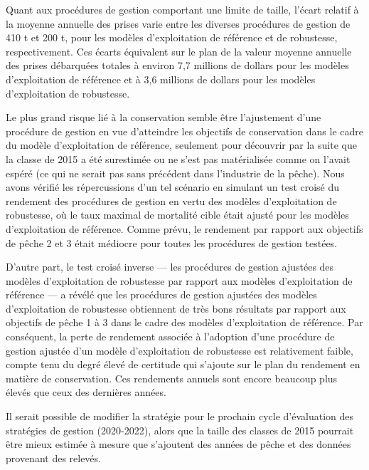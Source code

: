 \documentclass[11pt]{book}
\begin{document}
Quant aux procédures de gestion comportant une limite de taille, l'écart relatif à la moyenne annuelle des prises varie entre les diverses procédures de gestion de 410 t et 200 t, pour les modèles d'exploitation de référence et de robustesse, respectivement. Ces écarts équivalent sur le plan de la valeur moyenne annuelle des prises débarquées totales à environ 7,7 millions de dollars pour les modèles d'exploitation de référence et à 3,6 millions de dollars pour les modèles d'exploitation de robustesse.

Le plus grand risque lié à la conservation semble être l'ajustement d'une procédure de gestion en vue d'atteindre les objectifs de conservation dans le cadre du modèle d'exploitation de référence, seulement pour découvrir par la suite que la classe de 2015 a été surestimée ou ne s'est pas matérialisée comme on l'avait espéré (ce qui ne serait pas sans précédent dans l'industrie de la pêche). Nous avons vérifié les répercussions d'un tel scénario en simulant un test croisé du rendement des procédures de gestion en vertu des modèles d'exploitation de robustesse, où le taux maximal de mortalité cible était ajusté pour les modèles d'exploitation de référence. Comme prévu, le rendement par rapport aux objectifs de pêche 2 et 3 était médiocre pour toutes les procédures de gestion testées.

D'autre part, le test croisé inverse --- les procédures de gestion ajustées des modèles d'exploitation de robustesse par rapport aux modèles d'exploitation de référence --- a révélé que les procédures de gestion ajustées des modèles d'exploitation de robustesse obtiennent de très bons résultats par rapport aux objectifs de pêche 1 à 3 dans le cadre des modèles d'exploitation de référence. Par conséquent, la perte de rendement associée à l'adoption d'une procédure de gestion ajustée d'un modèle d'exploitation de robustesse est relativement faible, compte tenu du degré élevé de certitude qui s'ajoute sur le plan du rendement en matière de conservation. Ces rendements annuels sont encore beaucoup plus élevés que ceux des dernières années.

Il serait possible de modifier la stratégie pour le prochain cycle d'évaluation des stratégies de gestion (2020-2022), alors que la taille des classes de 2015 pourrait être mieux estimée à mesure que s'ajoutent des années de pêche et des données provenant des relevés.
\end{document}
